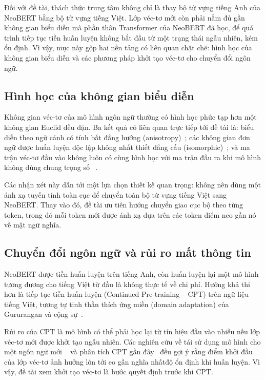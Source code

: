 Đối với đề tài, thách thức trung tâm không chỉ là thay bộ từ vựng tiếng Anh của NeoBERT
bằng bộ từ vựng tiếng Việt. Lớp véc-tơ mới còn phải nằm đủ gần không gian biểu diễn mà phần
thân Transformer của NeoBERT đã học, để quá trình tiếp tục tiền huấn luyện không bắt đầu từ
một trạng thái ngẫu nhiên, kém ổn định. Vì vậy, mục này gộp hai nền tảng có liên quan chặt chẽ: hình học
của không gian biểu diễn và các phương pháp khởi tạo véc-tơ cho chuyển đổi ngôn ngữ.

\subsection{Hình học của không gian biểu diễn}
\label{sec:geometry}

Không gian véc-tơ của mô hình ngôn ngữ thường có hình học phức tạp hơn một không gian
Euclid đều đặn. Ba kết quả có liên quan trực tiếp tới đề tài là: biểu diễn theo ngữ cảnh có
tính bất đẳng hướng (anisotropy)~\cite{ethayarajh2019contextual}; các không gian đơn ngữ được
huấn luyện độc lập không nhất thiết đẳng cấu (isomorphic)~\cite{ormazabal2019limitations}; và ma trận véc-tơ đầu vào
không luôn có cùng hình học với ma trận đầu ra khi mô hình không dùng chung trọng số
~\cite{gao2019degeneration}.

Các nhận xét này dẫn tới một lựa chọn thiết kế quan trọng: không nên dùng một ánh xạ tuyến
tính toàn cục để chuyển toàn bộ từ vựng tiếng Việt sang NeoBERT. Thay vào đó, đề tài ưu
tiên hướng chuyển giao cục bộ theo từng token, trong đó mỗi token mới được ánh xạ dựa trên
các token điểm neo gần nó về mặt ngữ nghĩa.

\subsection{Chuyển đổi ngôn ngữ và rủi ro mất thông tin}
\label{subsec:lang-adapt}

NeoBERT được tiền huấn luyện trên tiếng Anh, còn huấn luyện lại một mô hình tương đương cho
tiếng Việt từ đầu là không thực tế về chi phí. Hướng khả thi hơn là tiếp tục tiền huấn
luyện (Continued Pre-training -- CPT) trên ngữ liệu tiếng Việt, tương tự tinh thần thích
ứng miền (domain adaptation) của Gururangan và cộng sự~\cite{gururangan2020dapt}.

Rủi ro của CPT là mô hình có thể phải học lại từ tín hiệu đầu vào nhiễu nếu lớp véc-tơ mới
được khởi tạo ngẫu nhiên. Các nghiên cứu về tái sử dụng mô hình cho một ngôn ngữ mới
~\cite{devries2021recycle} và phân tích CPT gần đây~\cite{elhady2025emergent,ibrahim2024continual}
đều gợi ý rằng điểm khởi đầu của lớp véc-tơ ảnh hưởng lớn tới eo gần nghĩa nhấtđộ ổn định khi huấn luyện. Vì vậy,
đề tài xem khởi tạo véc-tơ là bước quyết định trước khi CPT.

